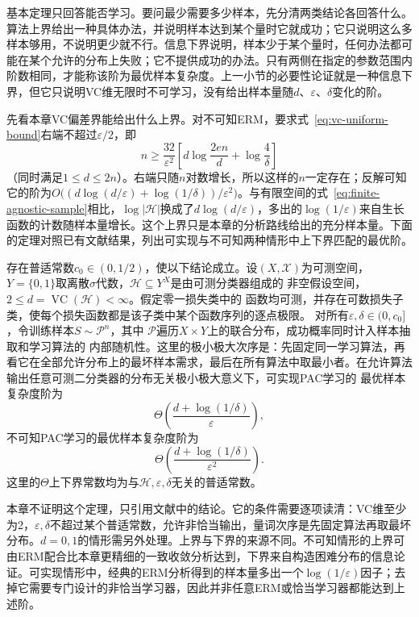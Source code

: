 基本定理只回答能否学习。要问最少需要多少样本，先分清两类结论各回答什么。算法上界给出一种具体办法，并说明样本达到某个量时它就成功；它只说明这么多样本够用，不说明更少就不行。信息下界说明，样本少于某个量时，任何办法都可能在某个允许的分布上失败；它不提供成功的办法。只有两侧在指定的参数范围内阶数相同，才能称该阶为最优样本复杂度。上一小节的必要性论证就是一种信息下界，但它只说明VC维无限时不可学习，没有给出样本量随$d$、$\varepsilon$、$\delta$变化的阶。

先看本章VC偏差界能给出什么上界。对不可知ERM，要求式~\eqref{eq:vc-uniform-bound}右端不超过$\varepsilon/2$，即
\[
 n\geq\frac{32}{\varepsilon^2}\left[d\log\frac{2en}{d}+\log\frac4\delta\right]
\]
（同时满足$1\leq d\leq2n$）。右端只随$n$对数增长，所以这样的$n$一定存在；反解可知它的阶为$O\bigl((d\log(d/\varepsilon)+\log(1/\delta))/\varepsilon^2\bigr)$。与有限空间的式~\eqref{eq:finite-agnostic-sample}相比，$\log|\mathcal H|$换成了$d\log(d/\varepsilon)$，多出的$\log(1/\varepsilon)$来自生长函数的计数随样本量增长。这个上界只是本章的分析路线给出的充分样本量。下面的定理对照已有文献结果，列出可实现与不可知两种情形中上下界匹配的最优阶。

\begin{theorem}[二分类的最优样本复杂度阶]
\label{thm:binary-optimal-sample-complexity}
存在普适常数$c_0\in(0,1/2)$，使以下结论成立。设$(X,\mathcal X)$为可测空间，
$Y=\{0,1\}$取离散$\sigma$代数，$\mathcal H\subseteq Y^X$是由可测分类器组成的
非空假设空间，$2\leq d=\operatorname{VC}(\mathcal H)<\infty$。假定零一损失类中的
函数均可测，并存在可数损失子类，使每个损失函数都是该子类中某个函数序列的逐点极限。
对所有$\varepsilon,\delta\in(0,c_0]$，令训练样本$S\sim\mathcal P^n$，其中
$\mathcal P$遍历$X\times Y$上的联合分布，成功概率同时计入样本抽取和学习算法的
内部随机性。这里的极小极大次序是：先固定同一学习算法，再看它在全部允许分布上的最坏样本需求，最后在所有算法中取最小者。在允许算法输出任意可测二分类器的分布无关极小极大意义下，可实现PAC学习的
最优样本复杂度阶为
\[
 \Theta\left(\frac{d+\log(1/\delta)}{\varepsilon}\right),
\]
不可知PAC学习的最优样本复杂度阶为
\[
 \Theta\left(\frac{d+\log(1/\delta)}{\varepsilon^2}\right).
\]
这里的$\Theta$上下界常数均为与$\mathcal H,\varepsilon,\delta$无关的普适常数。
\end{theorem}

本章不证明这个定理，只引用文献中的结论。它的条件需要逐项读清：VC维至少为2，$\varepsilon,\delta$不超过某个普适常数，允许非恰当输出，量词次序是先固定算法再取最坏分布。$d=0,1$的情形需另外处理。上界与下界的来源不同。不可知情形的上界可由ERM配合比本章更精细的一致收敛分析达到，下界来自构造困难分布的信息论证。可实现情形中，经典的ERM分析得到的样本量多出一个$\log(1/\varepsilon)$因子；去掉它需要专门设计的非恰当学习器，因此并非任意ERM或恰当学习器都能达到上述阶。

